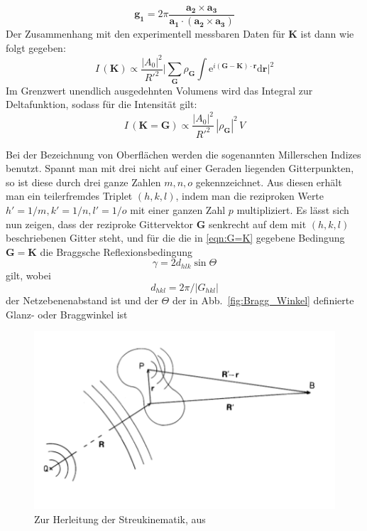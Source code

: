 \begin{equation}
    \mathbf{g_1} = 2 \pi \frac{\mathbf{a_2 \times a_3} }
        {\mathbf{a_1\cdot (a_2 \times a_3)}}
\end{equation}
Der Zusammenhang mit den experimentell messbaren Daten für $\mathbf{K}$ ist dann wie 
folgt gegeben:
\begin{equation} \label{eqn:G=K}
    I\,(\mathbf{K}) \propto \frac{|A_0|^2}{R'^2} \Big| \sum_{\mathbf{G}} \rho_{\mathbf{G}} 
    \int \mathrm{e}^{i \mathbf{(G - K) \cdot r}} \mathrm{d} \mathbf{r} \Big|^2
\end{equation}
Im Grenzwert unendlich ausgedehnten Volumens wird das Integral zur Deltafunktion, sodass 
für die Intensität gilt:
\begin{equation}
    I\,(\mathbf{K = G}) \propto \frac{|A_0|^2}{R'^2} \,|\rho_{\mathbf{G}} |^2 \, V
\end{equation}

Bei der Bezeichnung von Oberflächen werden die sogenannten Millerschen Indizes benutzt. 
Spannt man mit drei nicht auf einer Geraden liegenden Gitterpunkten, so ist diese durch 
drei ganze Zahlen $m, n, o$ gekennzeichnet. Aus diesen erhält man ein teilerfremdes 
Triplet $(h, k, l)$, indem man die reziproken Werte $h' = 1/m, k' = 1/n, l' = 1/o$ mit 
einer ganzen Zahl $p$ multipliziert. Es lässt sich nun zeigen, dass der reziproke 
Gittervektor $\mathbf{G}$ senkrecht auf dem mit $(h, k, l)$ beschriebenen Gitter steht, 
und für die die in \ref{eqn:G=K} gegebene Bedingung $\mathbf{G = K}$ die Braggsche Reflexionsbedingung 
\begin{equation}
    \gamma = 2 d_{hlk} \sin \Theta
\end{equation}
gilt, wobei 
\begin{equation}
    d_{hkl}=2 \pi / |G_{hkl}|
\end{equation}
der Netzebenenabstand ist und der $\Theta$ der in Abb.~\ref{fig:Bragg_Winkel} definierte
Glanz- oder Braggwinkel ist



\begin{figure}
    \includegraphics[width=1.0\textwidth]{pics/scatter_geometry}
    \caption{Zur Herleitung der Streukinematik,
aus \cite{ibach2009festkorperphysik} }
    \label{fig:scatter_geometry}
\end{figure}


